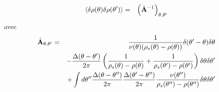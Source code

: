 \begin{eqnarray*}
	\langle \delta \rho(\theta) \delta \rho(\theta') \rangle  & = & \left ( \hat{\mathbf{A}}^{-1} \right )_{\theta,\theta'} 
\end{eqnarray*}
 avec 
\begin{eqnarray*}
	 \hat{\mathbf{A}}_{\theta,\theta'}  & = &  \frac{1}{\nu(\theta) ( \rho_s ( \theta ) - \rho(\theta) ) } \delta ( \theta' - \theta ) \delta \theta \\
	 &  & - \frac{\Delta(\theta - \theta')}{2\pi}\left ( \frac{1}{\rho_s(\theta) - \rho(\theta)} + \frac{1}{\rho_s(\theta') - \rho(\theta')}\right )\delta \theta\delta \theta'\\
	 &  & + \int d \theta'' \frac{\Delta(\theta - \theta'')}{2\pi}\frac{\Delta(\theta' - \theta'')}{2\pi} \frac{ \nu(\theta'')}{\rho_s(\theta'') - \rho(\theta'')} \delta \theta\delta \theta'   		
\end{eqnarray*}


